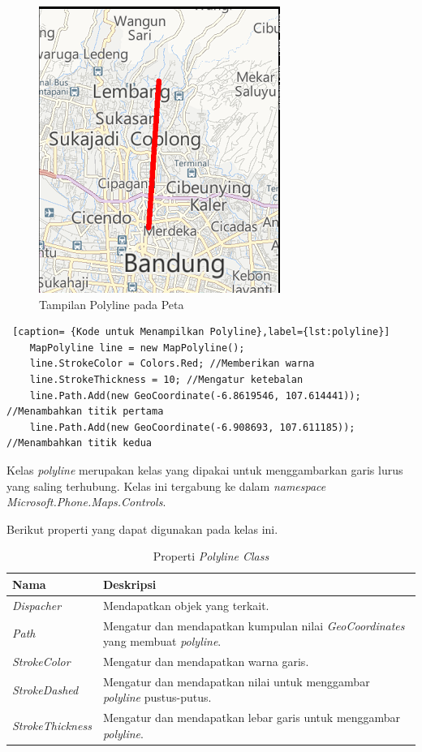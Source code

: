 \begin{figure}[h]
	\centering
		\includegraphics[scale=0.5]{Gambar/kontrol/polyline}
	\caption{Tampilan Polyline pada Peta}
	\label{fig:TampilanpolylinepadaPeta}
\end{figure}

\begin{lstlisting} [caption= {Kode untuk Menampilkan Polyline},label={lst:polyline}]
	MapPolyline line = new MapPolyline();
	line.StrokeColor = Colors.Red; //Memberikan warna
	line.StrokeThickness = 10; //Mengatur ketebalan
	line.Path.Add(new GeoCoordinate(-6.8619546, 107.614441)); //Menambahkan titik pertama
	line.Path.Add(new GeoCoordinate(-6.908693, 107.611185)); //Menambahkan titik kedua
\end{lstlisting}

\hspace{0.5cm} Kelas \textit{polyline} merupakan kelas yang dipakai untuk menggambarkan garis lurus yang saling terhubung. Kelas ini tergabung ke dalam \textit{namespace Microsoft.Phone.Maps.Controls}. 

Berikut properti yang dapat digunakan pada kelas ini.
\begin{table}[h]
	\centering
		\begin{tabular}{ |p{4cm}|p{10cm}|}
				\hline
					Nama & Deskripsi \\ \hline
					\textit{Dispacher} & Mendapatkan objek yang terkait. \\ \hline
					\textit{Path} & Mengatur dan mendapatkan kumpulan nilai \textit{GeoCoordinates} yang membuat \textit{polyline}. \\ \hline
					\textit{StrokeColor} & Mengatur dan mendapatkan warna garis. \\ \hline
					\textit{StrokeDashed} & Mengatur dan mendapatkan nilai untuk menggambar \textit{polyline} pustus-putus. \\ \hline
					\textit{StrokeThickness} & Mengatur dan mendapatkan lebar garis untuk menggambar \textit{polyline}. \\ \hline
				\hline
		\end{tabular}
	\caption{Properti \textit{Polyline Class}}
	\label{tab:PropertiKelasPolyline}
\end{table}

